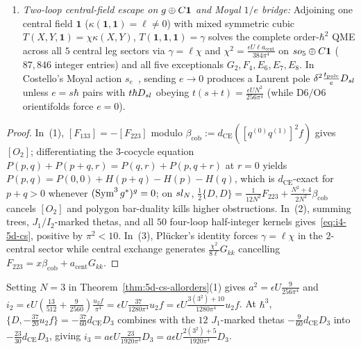 \begin{theorem}
\begin{enumerate}[label=(\arabic*),leftmargin=*]
  \item \emph{Two-loop central-field escape on $g\oplus C\mathbf{1}$ and Moyal $1/e$ bridge:} Adjoining one central field $\mathbf{1}$ ($\kappa(\mathbf{1},\mathbf{1}) = \ell \neq 0$) with mixed symmetric cubic $T(X,Y,\mathbf{1}) = \chi\kappa(X,Y)$, $T(\mathbf{1},\mathbf{1},\mathbf{1}) = \gamma$ solves the complete order-$\hbar^2$ QME across all $5$ central leg sectors via $\gamma = \ell\chi$ and $\chi^2 = \frac{\epsilon U\ell a_{\mathrm{cent}}}{384\pi^4}$ on $so_5\oplus C\mathbf{1}$ ($87{,}846$ integer entries) and all five exceptionals $G_2,F_4,E_6,E_7,E_8$. In Costello's Moyal action $s_e$~\cite{Costello16}, sending $e \to 0$ produces a Laurent pole $\delta^2\frac{t_{\mathrm{pole}}}{e}D_{sl}$ unless $e = s\hbar$ pairs with $t\hbar D_{sl}$ obeying $t(s+t) = \frac{\epsilon U N^2}{256\pi^4}$ (while $\mathrm{D}6/\mathrm{O}6$ orientifolds force $e=0$).
\end{enumerate}
\end{theorem}

\begin{proof}
In~(1), $[F_{133}] = -[F_{223}]$ modulo $\beta_{\mathrm{cob}} := d_{\mathrm{CE}}([q^{(0)}q^{(1)}]^2 f)$ gives $[O_2]$; differentiating the $3$-cocycle equation $P(p,q)+P(p+q,r)=P(q,r)+P(p,q+r)$ at $r=0$ yields $P(p,q) = P(0,0)+H(p+q)-H(p)-H(q)$, which is $d_{\mathrm{CE}}$-exact for $p+q>0$ whenever $(\operatorname{Sym}^3g^*)^{g}=0$; on $sl_N$, $\frac{1}{2}\{D,D\} = \frac{1}{12N^2}F_{223} + \frac{N^2+4}{2N^2}\beta_{\mathrm{cob}}$ cancels $[O_2]$ and polygon bar-duality kills higher obstructions. In~(2), summing trees, $J_1/I_2$-marked thetas, and all $50$ four-loop half-integer kernels gives~\eqref{eq:i4-5d-cs}, positive by $\pi^2 < 10$. In~(3), Pl\"ucker's identity forces $\gamma = \ell\chi$ in the $2$-central sector while central exchange generates $\frac{\chi^2}{8\ell}G_{kk}$ cancelling $F_{223} = x\beta_{\mathrm{cob}} + a_{\mathrm{cent}}G_{kk}$.
\end{proof}

\begin{example}[Explicit arithmetic spot check on $\fg = \fsl_3(\C)$ at orders $\hbar^2$ and $\hbar^3$]
\label{ex:sl3-spotcheck}
Setting $N = 3$ in Theorem~\ref{thm:5d-cs-allorders}(1) gives $a^2 = \epsilon U\frac{9}{256\pi^4}$ and $i_2 = \epsilon U(\frac{13}{512} + \frac{9}{2560})\frac{u_2 f}{\pi^4} = \epsilon U\frac{37}{1280\pi^4}u_2 f = \epsilon U\frac{3(3^2)+10}{1280\pi^4}u_2 f$. At $\hbar^3$, $\{D, -\frac{37}{20}u_2 f\} = -\frac{37}{60}d_{\mathrm{CE}}D_3$ combines with the $12$ $J_1$-marked thetas $-\frac{9}{60}d_{\mathrm{CE}}D_3$ into $-\frac{23}{30}d_{\mathrm{CE}}D_3$, giving $i_3 = a\epsilon U\frac{23}{1920\pi^4}D_3 = a\epsilon U\frac{2(3^2)+5}{1920\pi^4}D_3$.
\end{example}

